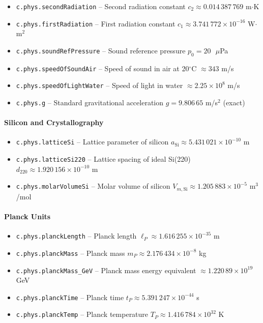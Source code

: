 \begin{itemize}
\item \texttt{c.phys.secondRadiation} -- Second radiation constant $c_2 \approx 0.014\,387\,769$ m$\cdot$K
\item \texttt{c.phys.firstRadiation} -- First radiation constant $c_1 \approx 3.741\,772 \times 10^{-16}$ W$\cdot$m$^2$
\item \texttt{c.phys.soundRefPressure} -- Sound reference pressure $p_0 = 20\text{ }\mu$Pa
\item \texttt{c.phys.speedOfSoundAir} -- Speed of sound in air at 20$^\circ$C $\approx 343$ m/s
\item \texttt{c.phys.speedOfLightWater} -- Speed of light in water $\approx 2.25 \times 10^{8}$ m/s
\item \texttt{c.phys.g} -- Standard gravitational acceleration $g = 9.806\,65$ m/s$^2$ (exact)
\end{itemize}

\paragraph{Silicon and Crystallography}
\begin{itemize}
\item \texttt{c.phys.latticeSi} -- Lattice parameter of silicon $a_{\text{Si}} \approx 5.431\,021 \times 10^{-10}$ m
\item \texttt{c.phys.latticeSi220} -- Lattice spacing of ideal Si(220) $d_{220} \approx 1.920\,156 \times 10^{-10}$ m
\item \texttt{c.phys.molarVolumeSi} -- Molar volume of silicon $V_{m,\text{Si}} \approx 1.205\,883 \times 10^{-5}$ m$^3$/mol
\end{itemize}

\paragraph{Planck Units}
\begin{itemize}
\item \texttt{c.phys.planckLength} -- Planck length $\ell_P \approx 1.616\,255 \times 10^{-35}$ m
\item \texttt{c.phys.planckMass} -- Planck mass $m_P \approx 2.176\,434 \times 10^{-8}$ kg
\item \texttt{c.phys.planckMass\_GeV} -- Planck mass energy equivalent $\approx 1.220\,89 \times 10^{19}$ GeV
\item \texttt{c.phys.planckTime} -- Planck time $t_P \approx 5.391\,247 \times 10^{-44}$ s
\item \texttt{c.phys.planckTemp} -- Planck temperature $T_P \approx 1.416\,784 \times 10^{32}$ K
\end{itemize}

